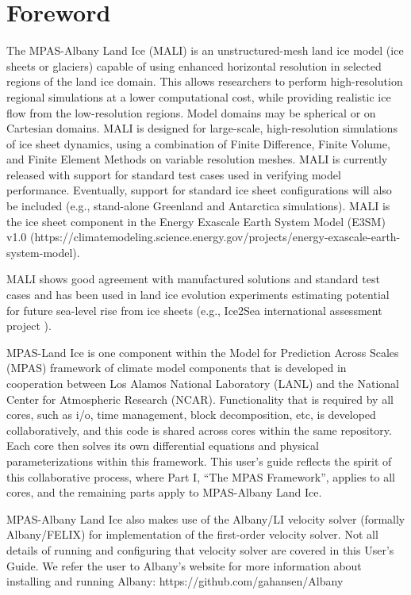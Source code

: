 \chapter*{Foreword}
\label{chap:foreword}

The MPAS-Albany Land Ice (MALI) is an unstructured-mesh land ice model (ice sheets or glaciers) capable of using enhanced 
horizontal resolution in selected regions of the land ice domain.  
This allows researchers to perform high-resolution regional simulations at a lower computational cost, 
while providing realistic ice flow from the low-resolution regions. 
Model domains may be spherical or on Cartesian domains.  
MALI is designed for large-scale, high-resolution simulations of ice sheet dynamics, 
using a combination of Finite Difference, Finite Volume, and Finite Element Methods on variable resolution meshes.  
MALI is currently released with support for standard test cases used in verifying model performance. 
Eventually, support for standard ice sheet configurations will also be included 
(e.g., stand-alone Greenland and Antarctica simulations).
MALI is the ice sheet component in the Energy Exascale Earth System Model (E3SM) v1.0
(https://climatemodeling.science.energy.gov/projects/energy-exascale-earth-system-model).

MALI shows good agreement with manufactured solutions and standard test cases
and has been used in land ice evolution experiments estimating potential for future sea-level rise from ice sheets 
(e.g., Ice2Sea international assessment project \citep{Shannon2013, edwards2014}).  

MPAS-Land Ice is one component within the Model for Prediction Across Scales (MPAS) framework of climate model components
 that is developed in cooperation between Los Alamos National Laboratory (LANL) and the National Center for Atmospheric Research (NCAR).  
Functionality that is required by all cores, such as i/o, time management, block decomposition, etc, is developed collaboratively, and this code is shared across cores within the same repository.  
Each core then solves its own differential equations and physical parameterizations within this framework.  
This user's guide reflects the spirit of this collaborative process, where Part I, ``The MPAS Framework'', applies to all cores, 
and the remaining parts apply to MPAS-Albany Land Ice.

MPAS-Albany Land Ice also makes use of the Albany/LI velocity solver (formally Albany/FELIX) for implementation of the first-order
velocity solver.  Not all details of running and configuring that velocity solver are covered in this User's Guide.  
We refer the user to Albany's website for more information about installing and running Albany: https://github.com/gahansen/Albany

